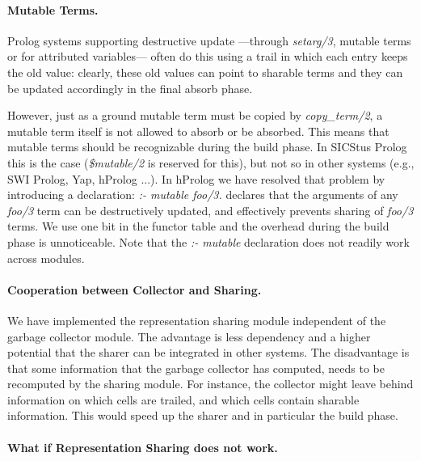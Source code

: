 \documentclass{tlp}
\begin{document}
\paragraph{\bf Mutable Terms.}\label{mutable}

Prolog systems supporting destructive update ---through {\em setarg/3},
mutable terms or for attributed variables--- often do this using a
trail in which each entry keeps the old value: clearly, these old
values can point to sharable terms and they can be updated accordingly
in the final absorb phase.

However, just as a ground mutable term must be copied by {\em copy\_term/2},
a mutable term itself is not allowed to absorb or be absorbed. This
means that mutable terms should be recognizable during the build
phase. In SICStus Prolog this is the case ({\em \$mutable/2} is reserved
for this), but not so in other systems (e.g., SWI Prolog, Yap, hProlog
...). In hProlog we have resolved that problem by introducing a
declaration: {\em :- mutable foo/3.} declares that the arguments of
any {\em foo/3} term can be destructively updated, and effectively prevents
sharing of {\em foo/3} terms. We use one bit in the functor table and the
overhead during the build phase is unnoticeable.
Note that the {\em :- mutable} declaration does not readily work
across modules.

\paragraph{\bf Cooperation between Collector and Sharing.}

We have implemented the representation sharing module independent of
the garbage collector module. The advantage is less dependency and
a higher potential that the sharer can be integrated in other
systems. The disadvantage is that some information that the garbage
collector has computed, needs to be recomputed by the sharing
module. For instance, the collector might leave behind information on
which cells are trailed, and which cells contain sharable
information. This would speed up the sharer and in particular the
build phase.


\paragraph{\bf What if Representation Sharing does not work.}
\end{document}
